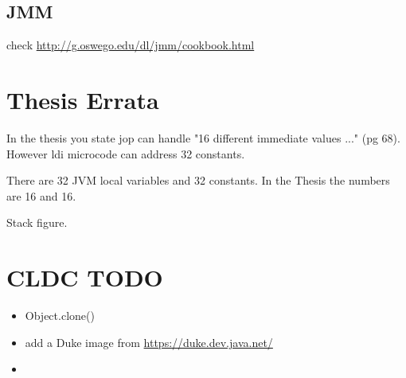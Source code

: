 \documentclass[a4paper,12pt]{scrartcl}
\begin{document}
\subsection{JMM}

check \url{http://g.oswego.edu/dl/jmm/cookbook.html}

\section{Thesis Errata}

In the thesis you state jop can handle "16 different immediate
values ..." (pg 68). However ldi microcode can address 32 constants.

There are 32 JVM local variables and 32 constants. In the Thesis the
numbers are 16 and 16.

Stack figure.

\section{CLDC TODO}

\begin{itemize}
    \item Object.clone()
    \item add a Duke image from \url{https://duke.dev.java.net/}
    \item
\end{itemize}
\end{document}

